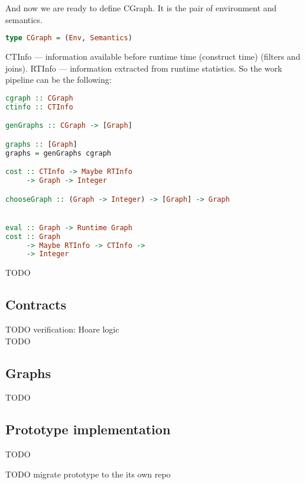 And now we are ready to define CGraph.
It is the pair of environment and semantics.

\begin{lstlisting}[language=Haskell]
type CGraph = (Env, Semantics)
\end{lstlisting}

CTInfo --- information available before runtime time (construct time) (filters and joins).
RTInfo --- information extracted from runtime statistics.
So the work pipeline can be the following:

\begin{lstlisting}[language=Haskell]
cgraph :: CGraph
ctinfo :: CTInfo

genGraphs :: CGraph -> [Graph]

graphs :: [Graph]
graphs = genGraphs cgraph

cost :: CTInfo -> Maybe RTInfo
     -> Graph -> Integer

chooseGraph :: (Graph -> Integer) -> [Graph] -> Graph


eval :: Graph -> Runtime Graph
cost :: Graph
     -> Maybe RTInfo -> CTInfo ->
     -> Integer

\end{lstlisting}

TODO

\subsection{Contracts}

TODO verification: Hoare logic \\
TODO

\subsection{Graphs}

TODO

\subsection{Prototype implementation}

TODO

TODO migrate prototype to the its own repo

